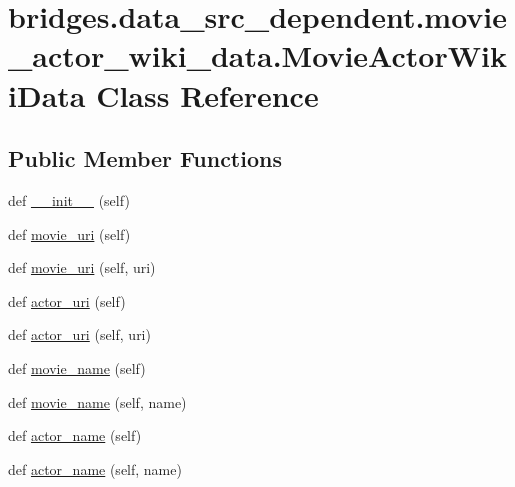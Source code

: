 \hypertarget{classbridges_1_1data__src__dependent_1_1movie__actor__wiki__data_1_1_movie_actor_wiki_data}{}\section{bridges.\+data\+\_\+src\+\_\+dependent.\+movie\+\_\+actor\+\_\+wiki\+\_\+data.\+Movie\+Actor\+Wiki\+Data Class Reference}
\label{classbridges_1_1data__src__dependent_1_1movie__actor__wiki__data_1_1_movie_actor_wiki_data}
\subsection*{Public Member Functions}
\begin{DoxyCompactItemize}
\item 
def \hyperlink{classbridges_1_1data__src__dependent_1_1movie__actor__wiki__data_1_1_movie_actor_wiki_data_a9f1d5ab83dd834e7cebfeb195b0c2c80}{\+\_\+\+\_\+init\+\_\+\+\_\+} (self)
\item 
def \hyperlink{classbridges_1_1data__src__dependent_1_1movie__actor__wiki__data_1_1_movie_actor_wiki_data_ae2931df20e7bbd6afead98918c57f8eb}{movie\+\_\+uri} (self)
\item 
def \hyperlink{classbridges_1_1data__src__dependent_1_1movie__actor__wiki__data_1_1_movie_actor_wiki_data_ae9e09370897da0ed4daa3a9378907b50}{movie\+\_\+uri} (self, uri)
\item 
def \hyperlink{classbridges_1_1data__src__dependent_1_1movie__actor__wiki__data_1_1_movie_actor_wiki_data_a7f0c73452d586c0eb037b4e1c53efcba}{actor\+\_\+uri} (self)
\item 
def \hyperlink{classbridges_1_1data__src__dependent_1_1movie__actor__wiki__data_1_1_movie_actor_wiki_data_afaf6adac7e472a88852551cc8650b391}{actor\+\_\+uri} (self, uri)
\item 
def \hyperlink{classbridges_1_1data__src__dependent_1_1movie__actor__wiki__data_1_1_movie_actor_wiki_data_aa76d0a5fb3b3ce8f7209ddf9efabb1cb}{movie\+\_\+name} (self)
\item 
def \hyperlink{classbridges_1_1data__src__dependent_1_1movie__actor__wiki__data_1_1_movie_actor_wiki_data_aea5e460c9e8f74f56b0a70c4ef3f834a}{movie\+\_\+name} (self, name)
\item 
def \hyperlink{classbridges_1_1data__src__dependent_1_1movie__actor__wiki__data_1_1_movie_actor_wiki_data_a7fcdb04a061044e590601c2298cf8b5d}{actor\+\_\+name} (self)
\item 
def \hyperlink{classbridges_1_1data__src__dependent_1_1movie__actor__wiki__data_1_1_movie_actor_wiki_data_a00c9cd99fb43f7bdc32e28b1ad9a91db}{actor\+\_\+name} (self, name)
\end{DoxyCompactItemize}



